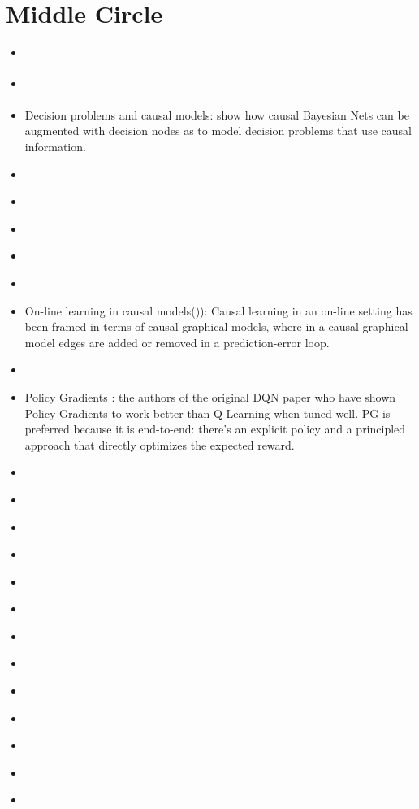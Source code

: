 \documentclass[11pt]{article}
\theoremstyle{plain}
\begin{document}
\section{Middle Circle}
\begin{itemize}
\item \cite{baxter2001infinite}
\item \cite{boyan2002technical}
\item Decision problems and causal models: \cite{dawid2002influence} show how causal Bayesian Nets can be augmented with decision nodes as to model decision problems that use causal information.
\item \cite{konda2003onactor}
\item \cite{richter2007natural}
\item \cite{hagmayer2009decision}
\item \cite{meder2009role}
\item \cite{meder2010observing}
\item On-line learning in causal models(\cite{wellen2012learning})):  Causal learning in an on-line setting has been framed in terms of causal graphical models, where in a causal graphical model edges are added or removed in a prediction-error loop.
\item \cite{grondman2012survey}
\item Policy Gradients  \cite{DBLP:journals/corr/MnihBMGLHSK16}: the authors of the original DQN paper who have shown Policy Gradients to work better than Q Learning when tuned well. PG is preferred because it is end-to-end: there’s an explicit policy and a principled approach that directly optimizes the expected reward.
\item \cite{lopez2015towards}
\item \cite{NIPS2016_6234}
\item \cite{NIPS2016_6266}
\item \cite{NIPS2016_6059}
\item \cite{NIPS2016_6233}
\item \cite{NIPS2016_6042}
\item \cite{DBLP:journals/corr/SchulmanMLJA15}
\item \cite{goudet2017learning}
\item \cite{firoiu2017beating}
\item \cite{leibo2017multi}
\item \cite{amarjyoti2017deep}
\item \cite{NIPS2017_7019}
\item \cite{NIPS2017_7084}

\end{itemize}
\end{document}
